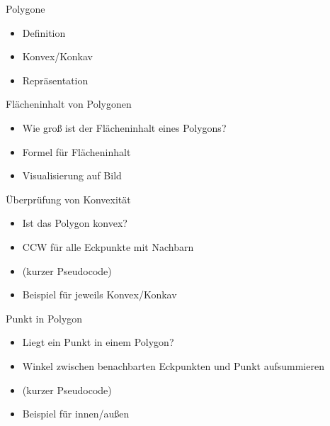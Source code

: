 \begin{frame}{Polygone}
	\begin{itemize}
		\item Definition
		\item Konvex/Konkav
		\item Repräsentation
	\end{itemize}
\end{frame}

\begin{frame}{Flächeninhalt von Polygonen}
	\begin{itemize}
		\item Wie groß ist der Flächeninhalt eines Polygons?
		\item Formel für Flächeninhalt
		\item Visualisierung auf Bild
	\end{itemize}
\end{frame}

\begin{frame}{Überprüfung von Konvexität}
	\begin{itemize}
		\item Ist das Polygon konvex?
		\item CCW für alle Eckpunkte mit Nachbarn
		\item (kurzer Pseudocode)
		\item Beispiel für jeweils Konvex/Konkav
	\end{itemize}
\end{frame}

\begin{frame}{Punkt in Polygon}
	\begin{itemize}
		\item Liegt ein Punkt in einem Polygon?
		\item Winkel zwischen benachbarten Eckpunkten und Punkt aufsummieren
		\item (kurzer Pseudocode)
		\item Beispiel für innen/außen
	\end{itemize}
\end{frame}
